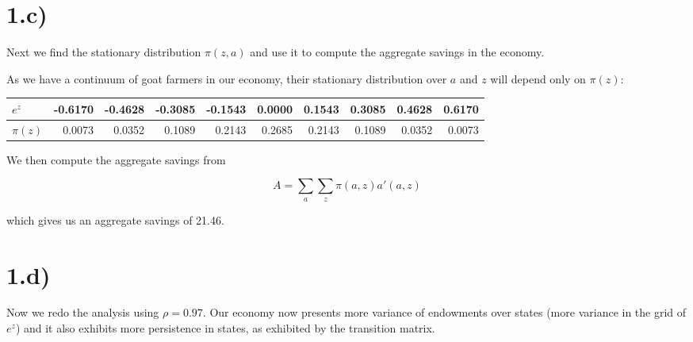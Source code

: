 \documentclass{article}
\begin{document}
\section*{1.c)}

Next we find the stationary distribution $\pi(z, a)$ and use it to compute the aggregate savings in the
economy.

As we have a continuum of goat farmers in our economy, their stationary distribution over $a$ and $z$
will depend only on $\pi(z)$:

\begin{scriptsize}
\begin{tabular}{l|rrrrrrrrr}
   $e^z$  & -0.6170 & -0.4628 & -0.3085 & -0.1543 & 0.0000 &  0.1543  &  0.3085 &   0.4628 & 0.6170 \\ \hline
   $\pi(z)$ & 0.0073 &  0.0352 &  0.1089 &  0.2143 & 0.2685  &  0.2143  &  0.1089 &   0.0352 & 0.0073 \\
\end{tabular}
\end{scriptsize}

We then compute the aggregate savings from

	$$ A = \sum_a \sum_z \pi(a,z) a'(a,z) $$

which gives us an aggregate savings of 21.46.

\section*{1.d)}

Now we redo the analysis using $\rho = 0.97$. Our economy now presents more
variance of endowments over states (more variance in the grid of $e^z$) and it
also exhibits more persistence in states, as exhibited by the transition
matrix.
\end{document}
